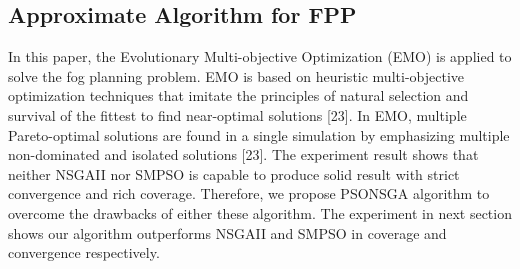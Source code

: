 \documentclass[10pt,journal,compsoc]{IEEEtran}
\begin{document}
\subsection{Approximate Algorithm for FPP}\label{sec:approximate}
In this paper, the Evolutionary Multi-objective Optimization (EMO) is applied to solve the fog planning problem. EMO is based on heuristic multi-objective optimization techniques that imitate the principles of natural selection and survival of the fittest to find near-optimal solutions [23]. In EMO, multiple Pareto-optimal solutions are found in a single simulation by emphasizing multiple non-dominated and isolated solutions [23].
The experiment result shows that neither NSGAII nor SMPSO is capable to produce solid result with strict convergence and rich coverage. Therefore, we propose PSONSGA algorithm to overcome the drawbacks of either these algorithm. The experiment in next section shows our algorithm outperforms NSGAII and SMPSO in coverage and convergence respectively.
\end{document}
